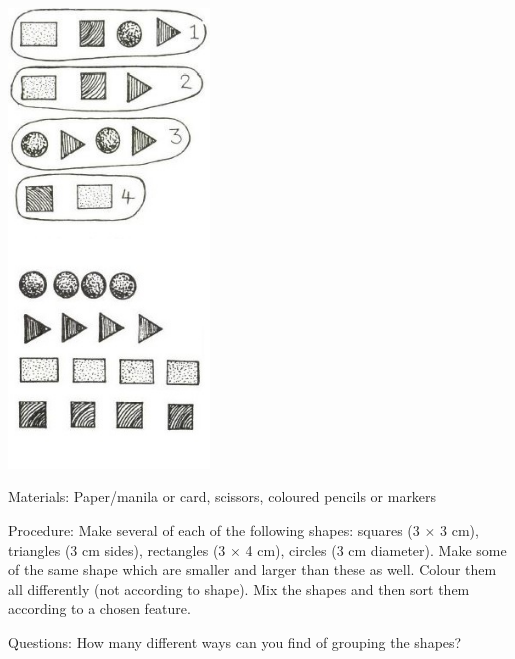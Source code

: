\begin{multicols}{2}
\begin{center}
\includegraphics[width=0.4\textwidth]{./img/source/arranging-shapes.jpg}
\end{center}

\begin{description*}
\item[Materials:]{Paper/manila or card, scissors, coloured pencils or markers}
\item[Procedure:]{Make several of each of the following
shapes: squares (3 $\times$ 3 cm), triangles (3 cm sides),
rectangles (3 $\times$ 4 cm), circles (3 cm diameter). Make some of the same shape which are smaller and larger than these as well. Colour them all differently (not according to shape).
Mix the shapes and then sort them according to
a chosen feature. }
\item[Questions:]{How many different ways can
you find of grouping the shapes?}
\end{description*}

\vfill
\columnbreak


\end{multicols}
